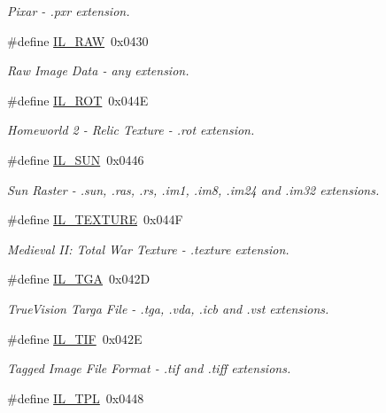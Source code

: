 \begin{DoxyCompactItemize}
\begin{DoxyCompactList}\small\item\em Pixar -\/ .pxr extension. \end{DoxyCompactList}\item 
\#define \hyperlink{group__il__formats_ga90b823d98bd7599f1afe79916858a64e}{I\+L\+\_\+\+R\+A\+W}~0x0430
\begin{DoxyCompactList}\small\item\em Raw Image Data -\/ any extension. \end{DoxyCompactList}\item 
\#define \hyperlink{group__il__formats_gaf18cd1ee46a7f53a71672cb8187737f4}{I\+L\+\_\+\+R\+O\+T}~0x044\+E
\begin{DoxyCompactList}\small\item\em Homeworld 2 -\/ Relic Texture -\/ .rot extension. \end{DoxyCompactList}\item 
\#define \hyperlink{group__il__formats_ga0862d8715842e491fc49d1b8c77a7bcb}{I\+L\+\_\+\+S\+U\+N}~0x0446
\begin{DoxyCompactList}\small\item\em Sun Raster -\/ .sun, .ras, .rs, .im1, .im8, .im24 and .im32 extensions. \end{DoxyCompactList}\item 
\#define \hyperlink{group__il__formats_gadbf6a57b74226ded9a04bf491d7c6ead}{I\+L\+\_\+\+T\+E\+X\+T\+U\+R\+E}~0x044\+F
\begin{DoxyCompactList}\small\item\em Medieval I\+I\+: Total War Texture -\/ .texture extension. \end{DoxyCompactList}\item 
\#define \hyperlink{group__il__formats_ga5fb2bda79b1e3198ae2f05f8af93a14b}{I\+L\+\_\+\+T\+G\+A}~0x042\+D
\begin{DoxyCompactList}\small\item\em True\+Vision Targa File -\/ .tga, .vda, .icb and .vst extensions. \end{DoxyCompactList}\item 
\#define \hyperlink{group__il__formats_ga4014e1df9671d92223fcf2cfcb4e438b}{I\+L\+\_\+\+T\+I\+F}~0x042\+E
\begin{DoxyCompactList}\small\item\em Tagged Image File Format -\/ .tif and .tiff extensions. \end{DoxyCompactList}\item 
\#define \hyperlink{group__il__formats_ga9f2f4982af8e2d6d9d48d98398de8dd7}{I\+L\+\_\+\+T\+P\+L}~0x0448

\end{DoxyCompactItemize}
